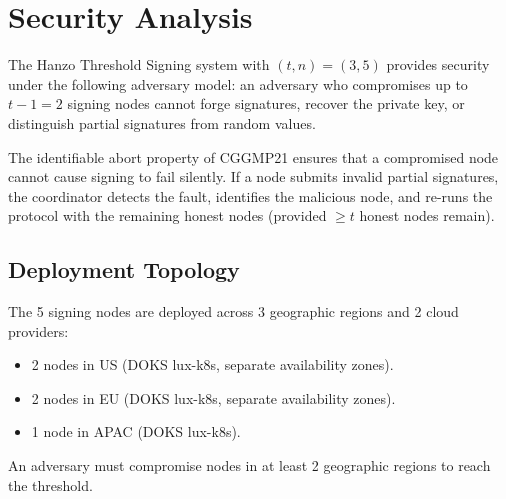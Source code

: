 \section{Security Analysis}

\label{sec:security}

\begin{theorem}
The Hanzo Threshold Signing system with $(t, n) = (3, 5)$ provides security
under the following adversary model: an adversary who compromises up to $t-1 = 2$
signing nodes cannot forge signatures, recover the private key, or distinguish
partial signatures from random values.
\end{theorem}

\begin{remark}
The identifiable abort property of CGGMP21 ensures that a compromised node
cannot cause signing to fail silently. If a node submits invalid partial
signatures, the coordinator detects the fault, identifies the malicious node,
and re-runs the protocol with the remaining honest nodes (provided $\geq t$
honest nodes remain).
\end{remark}

\subsection{Deployment Topology}

The 5 signing nodes are deployed across 3 geographic regions and 2 cloud
providers:
\begin{itemize}[leftmargin=1.1em]
    \item 2 nodes in US (DOKS lux-k8s, separate availability zones).
    \item 2 nodes in EU (DOKS lux-k8s, separate availability zones).
    \item 1 node in APAC (DOKS lux-k8s).
\end{itemize}

An adversary must compromise nodes in at least 2 geographic regions to reach
the threshold.

